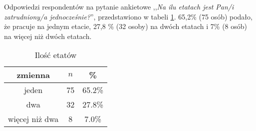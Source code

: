 Odpowiedzi respondentów na pytanie ankietowe ,,\textit{Na ilu etatach jest Pan/i zatrudniony/a jednocześnie?}'', przedstawiono w tabeli \ref{tab:Q2}. 
65,2\% (75 osób) podało, że pracuje na jednym etacie, 27,8 \% (32 osoby) na dwóch etatach i 7\% (8 osób) na więcej niż dwóch etatach.


\begin{table}[H]
\caption{Ilość etatów}
\centering
\begin{tabular}{ | c | c | c |}
\hline
zmienna & $n$ & \% \\
\hline
jeden  &  75  & 65.2\% \\
\hline
dwa  &  32  & 27.8\% \\
\hline
więcej niż dwa  &  8  & 7.0\% \\
\hline
\end{tabular}
\label{tab:Q2}
\end{table}

